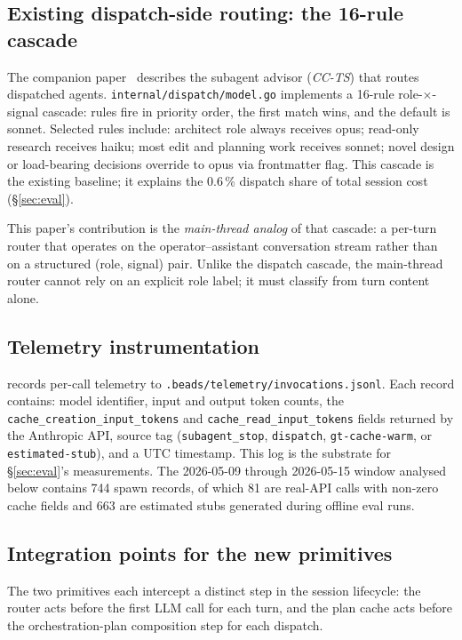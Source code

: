 \subsection{Existing dispatch-side routing: the 16-rule cascade}

The companion paper~\cite{moa1landscape} describes the subagent
advisor (\emph{CC-TS}) that routes dispatched agents.
\texttt{internal/dispatch/model.go} implements a 16-rule
role-\(\times\)-signal cascade: rules fire in priority order, the
first match wins, and the default is sonnet.  Selected rules include:
architect role always receives opus; read-only research receives haiku;
most edit and planning work receives sonnet; novel design or
load-bearing decisions override to opus via frontmatter flag.  This
cascade is the existing baseline; it explains the 0.6\,\% dispatch
share of total session cost (§\ref{sec:eval}).

This paper's contribution is the \emph{main-thread analog} of that
cascade: a per-turn router that operates on the operator–assistant
conversation stream rather than on a structured (role, signal) pair.
Unlike the dispatch cascade, the main-thread router cannot rely on an
explicit role label; it must classify from turn content alone.

\subsection{Telemetry instrumentation}

\blackrim records per-call telemetry to
\texttt{.beads/telemetry/invocations.jsonl}.  Each record contains:
model identifier, input and output token counts, the
\texttt{cache\_creation\_input\_tokens} and
\texttt{cache\_read\_input\_tokens} fields returned by the Anthropic
API, source tag (\texttt{subagent\_stop}, \texttt{dispatch},
\texttt{gt-cache-warm}, or \texttt{estimated-stub}), and a UTC
timestamp.  This log is the substrate for §\ref{sec:eval}'s
measurements.  The 2026-05-09 through 2026-05-15 window analysed
below contains 744 spawn records, of which 81 are real-API calls with
non-zero cache fields and 663 are estimated stubs generated during
offline eval runs.

\subsection{Integration points for the new primitives}

The two primitives each intercept a distinct step in the session lifecycle:
the router acts before the first LLM call for each turn, and the plan cache
acts before the orchestration-plan composition step for each dispatch.

